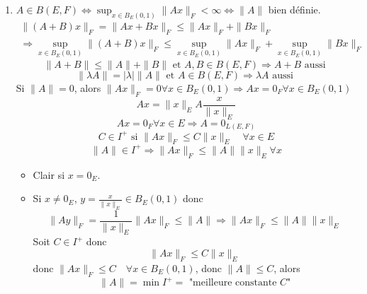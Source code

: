 \documentclass[a4paper]{report}
\let\implies\Rightarrow
\let\iff\Leftrightarrow
\theoremstyle{definition}
\begin{document}
\begin{preuve}
   \begin{enumerate}
       \item $A \in B(E, F) \iff \sup_{x \in B_{E}(0, 1)} \|Ax\|_{F} < \infty \iff \|A\|$ bien définie.  
           \begin{align*}
               \|(A + B)x\|_F = \|Ax + Bx\|_F \le \|Ax\|_F + \|Bx\|_F\\ \implies \sup_{x \in B_E(0, 1)} \|(A + B)x\|_F \le \sup_{x \in B_E(0, 1)} \|Ax\|_F + \sup_{x \in B_E(0, 1)} \|Bx\|_F
           \end{align*}
           \[
               \|A + B\| \le \|A\| + \|B\| \text{ et } A, B \in B(E, F) \implies A + B \text{ aussi }
           \] 
           \[
           \|\lambda A\| = |\lambda|\|A\| \text{ et } A \in B(E, F) \implies \lambda A \text{ aussi }
           \] 
           Si $\|A\| = 0$, alors  $\|Ax\|_F = 0 \forall x \in B_E(0, 1) \implies Ax = 0_F \forall x \in B_E(0, 1)$
           \[
           Ax = \|x\|_E A \frac{x}{\|x\|_E}
           \] 
           \[
           Ax = 0_F \forall x \in E \implies A = 0_{L(E, F)}
           \] 
           \[
           C \in I^+ \text{ si } \|Ax\|_F \le C\|x\|_E \quad \forall x \in E
           \] 
           \[
           \|A\| \in I^+ \implies \|Ax\|_F \le \|A\|\|x\|_E \forall x
           \] 
           \begin{itemize}
               \item Clair si $x = 0_E$. 
               \item Si  $x \neq 0_E$, $y = \frac{x}{\|x\|_E} \in B_E(0, 1)$ donc 
                   \[
                       \|Ay\|_F = \frac{1}{\|x\|_E}\|Ax\|_F \le \|A\| \implies \|Ax\|_F \le \|A\|\|x\|_E
                   \] 
                   Soit $C \in I^+$ donc  
                   \[
                   \|Ax\|_F \le C\|x\|_E
                   \] 
                   donc $\|Ax\|_F \le C \quad \forall x \in B_E(0,1)$, donc $\|A\| \le C$, alors 
                   \[
                       \|A\| = \min I^+ = \text{ "meilleure constante $C$"}
                   \] 
           \end{itemize}
   \end{enumerate} 
\end{preuve}
\end{document}
